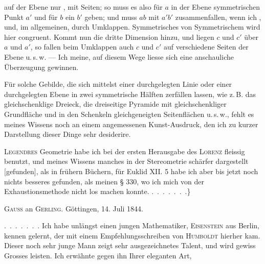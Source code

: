 %
\noindent auf der Ebene nur , mit  Seiten; so muss es also für $a$ in der Ebene
 symmetrischen Punkt $a'$ und für $b$ ein $b'$ geben; und muss $ab$ mit
$a'b'$ zusammenfallen, wenn ich , und, im allgemeinen,  durch
Umklappen. Symmetrisches von Symmetrischem wird hier congruent. Kommt
nun die dritte Dimension hinzu, und liegen  $c$ und $c'$ über $a$
und $a'$, so fallen beim Umklappen auch $c$ und $c'$ auf verschiedene Seiten
der Ebene u.\,s.\,w. --- Ich meine, auf diesem Wege liesse sich eine
anschauliche Überzeugung gewinnen.

\begin{center}\end{center}

Für solche Gebilde, die sich mittelst einer durchgelegten Linie oder einer
durchgelegten Ebene in zwei symmetrische Hälften zerfällen lassen, wie
z.\,B. das gleichschenklige Dreieck, die dreiseitige Pyramide mit
gleichschenkliger Grundfläche und in den Schenkeln gleichgeneigten
Seitenflächen u.\,s.\,w., fehlt es meines Wissens noch an einem angemessenen
Kunst-Ausdruck, den ich zu kurzer Darstellung dieser Dinge sehr desiderire.

\textsc{Legendres} Geometrie habe ich bei der ersten Herausgabe des
\textsc{Lorenz} fleissig benutzt, und meines Wissens manches in der
Stereometrie schärfer dargestellt [gefunden], als in frühern Büchern, für
Euklid XII. 5 habe ich aber bis jetzt noch nichts besseres gefunden, als
meinen § 330, wo ich mich von der Exhaustionsmethode nicht los machen
konnte. \mbox{.\ .\ .\ .\ .\ .\ .}\}

\begin{center}
\textsc{Gauss} an \textsc{Gerling.} Göttingen, 14. Juli 1844.
\end{center}

\mbox{.\ .\ .\ .\ .\ .\ .} Ich habe unlängst einen jungen Mathematiker, \textsc{Eisenstein}
aus Berlin, kennen gelernt, der mit einem Empfehlungsschreiben von
\textsc{Humboldt} hierher kam. Dieser noch sehr junge Mann zeigt sehr
ausgezeichnetes Talent, und wird gewiss Grosses leisten. Ich erwähnte gegen
ihn Ihrer eleganten Art,
